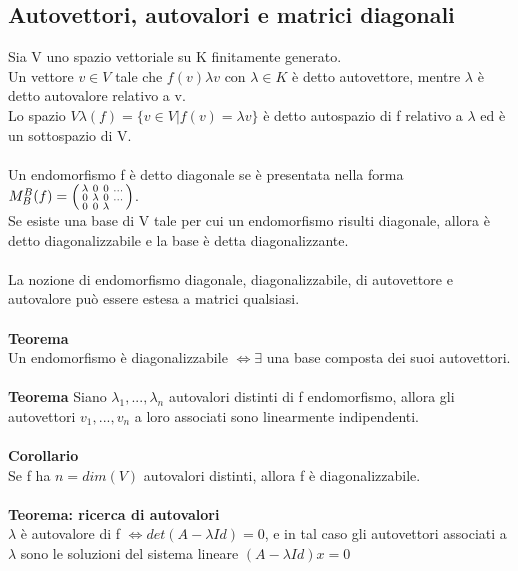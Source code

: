 \documentclass{article}
\begin{document}
\subsection{Autovettori, autovalori e matrici diagonali}
Sia V uno spazio vettoriale su K finitamente generato.\\
Un vettore $v\in V$ tale che $f(v)\lambda v$ con $\lambda\in K$ è detto autovettore, mentre $\lambda$ è detto autovalore relativo a v.\\
Lo spazio $V\lambda(f)=\{v\in V|f(v)=\lambda v\}$ è detto autospazio di f relativo a $\lambda$ ed è un sottospazio di V.\\\\
Un endomorfismo f è detto diagonale se è presentata nella forma $M_B^B(f)=\begin{psmallmatrix} \lambda & 0 & 0 & ... \\ 0 & \lambda & 0 & ... \\ 0 & 0 & \lambda \end{psmallmatrix}$.\\
Se esiste una base di V tale per cui un endomorfismo risulti diagonale, allora è detto diagonalizzabile e la base è detta diagonalizzante.\\\\
La nozione di endomorfismo diagonale, diagonalizzabile, di autovettore e autovalore può essere estesa a matrici qualsiasi.\\\\
\textbf{Teorema}\\
Un endomorfismo è diagonalizzabile $\Leftrightarrow \exists$ una base composta dei suoi autovettori.\\\\
\textbf{Teorema}
Siano $\lambda_1,...,\lambda_n$ autovalori distinti di f endomorfismo, allora gli autovettori $v_1,...,v_n$ a loro associati sono linearmente indipendenti.\\\\
\textbf{Corollario}\\
Se f ha $n=dim(V)$ autovalori distinti, allora f è diagonalizzabile.\\\\
\textbf{Teorema: ricerca di autovalori}\\
$\lambda$ è autovalore di f $\Leftrightarrow det(A-\lambda Id)=0$, e in tal caso gli autovettori associati a $\lambda$ sono le soluzioni del sistema lineare $(A-\lambda Id)x=0$
\end{document}
